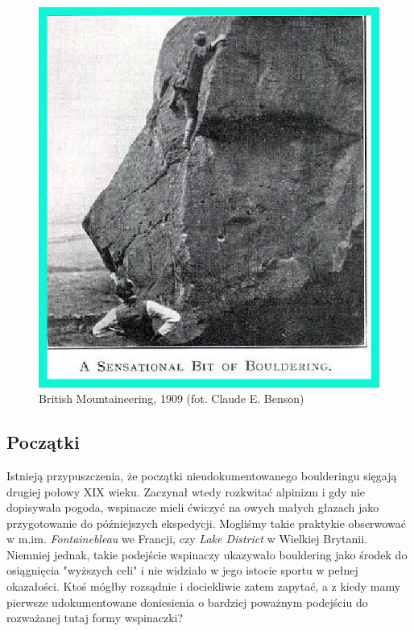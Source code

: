 \documentclass{article}
\begin{document}
\begin{figure}[!htbp]
	\begin{center}
		\includegraphics[width=\linewidth]{images/old1.eps}
	\end{center}
	\caption{British Mountaineering, 1909 (fot. Claude E. Benson) \cite{gill-history}}
	\label{benson}
\end{figure}

\subsection{Początki}
Istnieją przypuszczenia, że początki nieudokumentowanego boulderingu sięgają drugiej połowy XIX wieku. Zaczynał wtedy rozkwitać alpinizm i gdy nie dopisywała pogoda, wspinacze mieli ćwiczyć na owych małych głazach jako przygotowanie do późniejszych ekspedycji. Mogliśmy takie praktykie obserwować w m.im. \textit{Fontainebleau} we Francji, czy \textit{Lake District} w Wielkiej Brytanii. Niemniej jednak, takie podejście wspinaczy ukazywało bouldering jako środek do osiągnięcia "wyższych celi" i nie widziało w jego istocie sportu w pełnej okazałości. Ktoś mógłby rozsądnie i dociekliwie zatem zapytać, a z kiedy mamy pierwsze udokumentowane doniesienia o bardziej poważnym podejściu do rozważanej tutaj formy wspinaczki?
\end{document}
